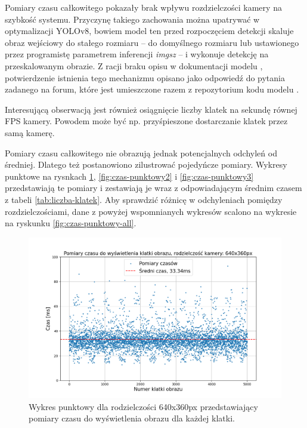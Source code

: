 Pomiary czasu całkowitego pokazały brak wpływu rozdzielczości kamery na szybkość systemu. Przyczynę takiego zachowania można upatrywać w optymalizacji YOLOv8, bowiem model ten przed rozpoczęciem detekcji skaluje obraz wejściowy do stałego rozmiaru -- do domyślnego rozmiaru lub ustawionego przez programistę parametrem inferencji \emph{imgsz} -- i wykonuje detekcję na przeskalowanym obrazie. Z racji braku opisu w dokumentacji modelu \cite{yolo_docs}, potwierdzenie istnienia tego mechanizmu opisano jako odpowiedź do pytania zadanego na forum, które jest umieszczone razem z repozytorium kodu modelu \cite{github_imgsz}.

Interesującą obserwacją jest również osiągnięcie liczby klatek na sekundę równej FPS kamery. Powodem może być np. przyśpieszone dostarczanie klatek przez samą kamerę.

Pomiary czasu całkowitego nie obrazują jednak potencjalnych odchyleń od średniej. Dlatego też postanowiono zilustrować pojedyńcze pomiary. Wykresy punktowe na rysnkach \ref{fig:czas-punktowy1}, \ref{fig:czas-punktowy2} i \ref{fig:czas-punktowy3} przedstawiają te pomiary i zestawiają je wraz z odpowiadającym średnim czasem z tabeli \ref{tab:liczba-klatek}. Aby sprawdzić różnicę w odchyleniach pomiędzy rozdzielczościami, dane z powyżej wspomnianych wykresów scalono na wykresie na ryskunku \ref{fig:czas-punktowy-all}.  


\begin{figure}[H]
    \centering
    \includegraphics[width=\linewidth]{r_test_szybkosci/punkty/1.png}
    \caption{Wykres punktowy dla rodzielczości 640x360px przedstawiający pomiary czasu do wyświetlenia obrazu dla każdej klatki.}
    \label{fig:czas-punktowy1}    
\end{figure}

